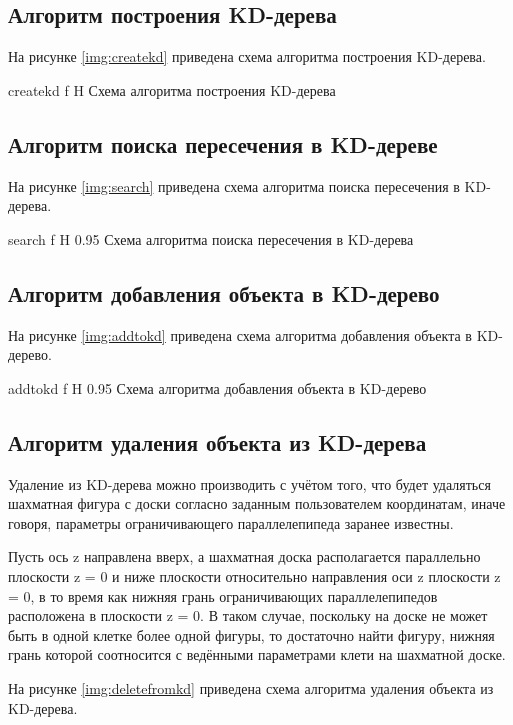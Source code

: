 \subsection{Алгоритм построения KD-дерева}

На рисунке \ref{img:createkd} приведена схема алгоритма построения KD-дерева.

{createkd}
{f}
{H}
{\textwidth}
{Схема алгоритма построения KD-дерева}

\subsection{Алгоритм поиска пересечения в KD-дереве}

На рисунке \ref{img:search} приведена схема алгоритма поиска пересечения в KD-дерева.

{search}
{f}
{H}
{0.95\textwidth}
{Схема алгоритма поиска пересечения в KD-дерева}

\subsection{Алгоритм добавления объекта в KD-дерево}

На рисунке \ref{img:addtokd} приведена схема алгоритма добавления объекта в KD-дерево.

{addtokd}
{f}
{H}
{0.95\textwidth}
{Схема алгоритма добавления объекта в KD-дерево}

\subsection{Алгоритм удаления объекта из KD-дерева}

Удаление из KD-дерева можно производить с учётом того, что будет удаляться шахматная фигура с доски согласно заданным пользователем координатам, иначе говоря, параметры ограничивающего параллелепипеда заранее известны.

Пусть ось z направлена вверх, а шахматная доска располагается параллельно плоскости z = 0 и ниже плоскости относительно направления оси z плоскости z = 0, в то время как нижняя грань ограничивающих параллелепипедов расположена в плоскости z = 0. 
В таком случае, поскольку на доске не может быть в одной клетке более одной фигуры, то достаточно найти фигуру, нижняя грань которой соотносится с ведёнными параметрами клети на шахматной доске.

На рисунке \ref{img:deletefromkd} приведена схема алгоритма удаления объекта из KD-дерева.

